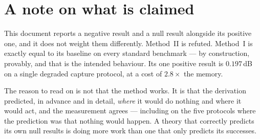 \section*{A note on what is claimed}

This document reports a negative result and a null result alongside its positive
one, and it does not weight them differently. Method~II is refuted. Method~I is
exactly equal to its baseline on every standard benchmark --- by construction,
provably, and that is the intended behaviour. Its
one positive result is $0.197$\,dB on a single degraded capture protocol, at a
cost of $2.8\times$ the memory.

The reason to read on is not that the method works. It is that the derivation
predicted, in advance and in detail, \emph{where} it would do nothing and where
it would act, and the measurement agrees --- including on the five protocols
where the prediction was that nothing would happen. A theory that correctly
predicts its own null results is doing more work than one that only predicts its
successes.
